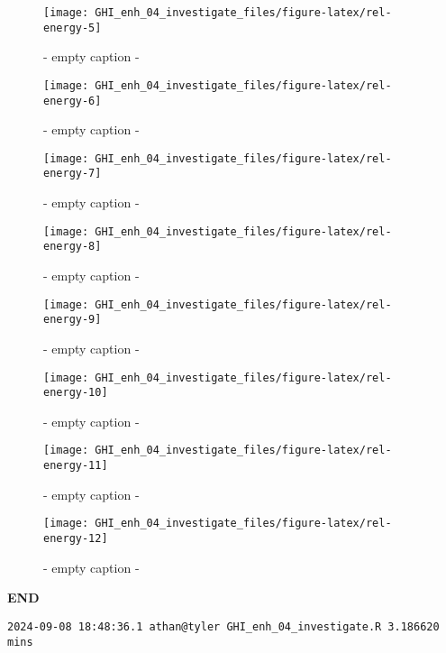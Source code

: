 \documentclass[
  10pt,
  a4paper,oneside]{article}
\begin{document}
\begin{figure}[H]

{\centering \texttt{[image: GHI\_enh\_04\_investigate\_files/figure-latex/rel-energy-5]} 

}

\caption{ - empty caption - }\label{fig:rel-energy-5}
\end{figure}
\begin{figure}[H]

{\centering \texttt{[image: GHI\_enh\_04\_investigate\_files/figure-latex/rel-energy-6]} 

}

\caption{ - empty caption - }\label{fig:rel-energy-6}
\end{figure}
\begin{figure}[H]

{\centering \texttt{[image: GHI\_enh\_04\_investigate\_files/figure-latex/rel-energy-7]} 

}

\caption{ - empty caption - }\label{fig:rel-energy-7}
\end{figure}
\begin{figure}[H]

{\centering \texttt{[image: GHI\_enh\_04\_investigate\_files/figure-latex/rel-energy-8]} 

}

\caption{ - empty caption - }\label{fig:rel-energy-8}
\end{figure}
\begin{figure}[H]

{\centering \texttt{[image: GHI\_enh\_04\_investigate\_files/figure-latex/rel-energy-9]} 

}

\caption{ - empty caption - }\label{fig:rel-energy-9}
\end{figure}
\begin{figure}[H]

{\centering \texttt{[image: GHI\_enh\_04\_investigate\_files/figure-latex/rel-energy-10]} 

}

\caption{ - empty caption - }\label{fig:rel-energy-10}
\end{figure}
\begin{figure}[H]

{\centering \texttt{[image: GHI\_enh\_04\_investigate\_files/figure-latex/rel-energy-11]} 

}

\caption{ - empty caption - }\label{fig:rel-energy-11}
\end{figure}
\begin{figure}[H]

{\centering \texttt{[image: GHI\_enh\_04\_investigate\_files/figure-latex/rel-energy-12]} 

}

\caption{ - empty caption - }\label{fig:rel-energy-12}
\end{figure}

\textbf{END}

\begin{verbatim}
2024-09-08 18:48:36.1 athan@tyler GHI_enh_04_investigate.R 3.186620 mins
\end{verbatim}
\end{document}
